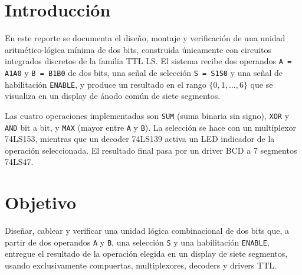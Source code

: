 \documentclass[a4paper,12pt]{article}
\newcommand{\materia}{Dise\~{n}o Digital Moderno}
\begin{document}
\newpage
\setcounter{page}{1}

\pagestyle{fancy}
\fancyhf{}
\setlength{\headheight}{15pt}
\fancyhead[L]{\materia}
\fancyfoot[C]{\thepage}
\renewcommand{\headrulewidth}{0.4pt}


\section{Introducci\'{o}n}
En este reporte se documenta el dise\~{n}o, montaje y verificaci\'{o}n
de una unidad aritm\'{e}tico-l\'{o}gica m\'{i}nima de dos bits, construida
\'{u}nicamente con circuitos integrados discretos de la familia TTL LS.
El sistema recibe dos operandos \texttt{A = A1A0} y \texttt{B = B1B0}
de dos bits, una se\~{n}al de selecci\'{o}n \texttt{S = S1S0} y una
se\~{n}al de habilitaci\'{o}n \texttt{ENABLE}, y produce un resultado
en el rango $\{0,1,\ldots,6\}$ que se visualiza en un display de
\'{a}nodo com\'{u}n de siete segmentos.

Las cuatro operaciones implementadas son \texttt{SUM} (suma binaria sin
signo), \texttt{XOR} y \texttt{AND} bit a bit, y \texttt{MAX} (mayor
entre \texttt{A} y \texttt{B}). La selecci\'{o}n se hace con un
multiplexor 74LS153, mientras que un decoder 74LS139 activa un LED
indicador de la operaci\'{o}n seleccionada. El resultado final pasa
por un driver BCD a 7 segmentos 74LS47.

\section{Objetivo}
Dise\~{n}ar, cablear y verificar una unidad l\'{o}gica combinacional de
dos bits que, a partir de dos operandos \texttt{A} y \texttt{B}, una
selecci\'{o}n \texttt{S} y una habilitaci\'{o}n \texttt{ENABLE},
entregue el resultado de la operaci\'{o}n elegida en un display de
siete segmentos, usando exclusivamente compuertas, multiplexores,
decoders y drivers TTL.

\end{document}
